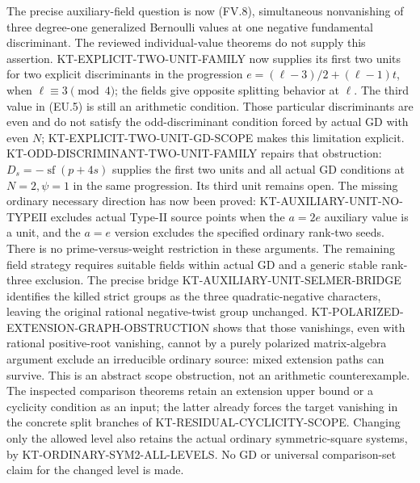 \documentclass[11pt,a4paper]{article}
\theoremstyle{definition}
\begin{document}
The precise auxiliary-field question is now (FV.8), simultaneous
nonvanishing of three degree-one generalized Bernoulli values
at one negative fundamental discriminant. The reviewed
individual-value theorems do not supply this assertion.
KT-EXPLICIT-TWO-UNIT-FAMILY now supplies its first two
units for two explicit discriminants in the progression
$e=(\ell-3)/2+(\ell-1)t$, when $\ell\equiv3\pmod4$;
the fields give opposite splitting behavior at $\ell$.
The third value in (EU.5) is still an arithmetic condition.
Those particular discriminants are even and do not satisfy
the odd-discriminant condition forced by actual GD with even
$N$; KT-EXPLICIT-TWO-UNIT-GD-SCOPE makes this limitation explicit.
KT-ODD-DISCRIMINANT-TWO-UNIT-FAMILY repairs that obstruction:
$D_s=-\operatorname{sf}(p+4s)$ supplies the first two units
and all actual GD conditions at $N=2,\psi=1$ in the same
progression. Its third unit remains open.
The missing ordinary necessary direction has now been proved:
KT-AUXILIARY-UNIT-NO-TYPEII excludes actual Type-II source points
when the $a=2e$ auxiliary value is a unit, and the $a=e$ version
excludes the specified ordinary rank-two seeds. There is no
prime-versus-weight restriction in these arguments.
The remaining field strategy requires suitable fields within
actual GD and a generic stable rank-three exclusion.
The precise bridge KT-AUXILIARY-UNIT-SELMER-BRIDGE identifies
the killed strict groups as the three quadratic-negative
characters, leaving the original rational negative-twist
group unchanged. KT-POLARIZED-EXTENSION-GRAPH-OBSTRUCTION
shows that those vanishings, even with rational positive-root
vanishing, cannot by a purely polarized matrix-algebra argument
exclude an irreducible ordinary source: mixed extension paths
can survive. This is an abstract scope obstruction, not an
arithmetic counterexample. The inspected comparison theorems
retain an extension upper bound or a cyclicity condition as an
input; the latter already forces the target vanishing in the
concrete split branches of KT-RESIDUAL-CYCLICITY-SCOPE.
Changing only the allowed level also retains the actual
ordinary symmetric-square systems, by
KT-ORDINARY-SYM2-ALL-LEVELS. No GD or universal comparison-set
claim for the changed level is made.
\end{document}
